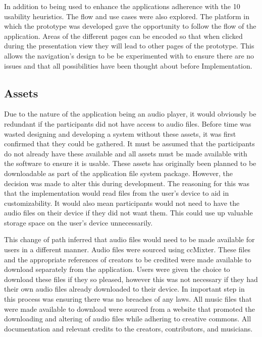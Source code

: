 \documentclass{l4proj}
\begin{document}
In addition to being used to enhance the applications adherence with the 10 usability heuristics. The flow and use cases were also explored. The platform in which the prototype was developed gave the opportunity to follow the flow of the application. Areas of the different pages can be encoded so that when clicked during the presentation view they will lead to other pages of the prototype. This allows the navigation's design to be be experimented with to ensure there are no issues and that all possibilities have been thought about before Implementation.

\subsection{Assets}

Due to the nature of the application being an audio player, it would obviously be redundant if the participants did not have access to audio files. Before time was wasted designing and developing a system without these assets, it was first confirmed that they could be gathered. It must be assumed that the participants do not already have these available and all assets must be made available with the software to ensure it is usable. These assets has originally been planned to be downloadable as part of the application file system package. However, the decision was made to alter this during development. The reasoning for this was that the implementation would read files from the user’s device to aid in customizability. It would also mean participants would not need to have the audio files on their device if they did not want them. This could use up valuable storage space on the user’s device unnecessarily. 

This change of path inferred that audio files would need to be made available for users in a different manner. Audio files were sourced using ccMixter. These files and the appropriate references of creators to be credited were made available to download separately from the application. Users were given the choice to download these files if they so pleased, however this was not necessary if they had their own audio files already downloaded to their device. In important step in this process was ensuring there was no breaches of any laws. All music files that were made available to download were sourced from a website that promoted the downloading and altering of audio files while adhering to creative commons. All documentation and relevant credits to the creators, contributors, and musicians.
\end{document}
